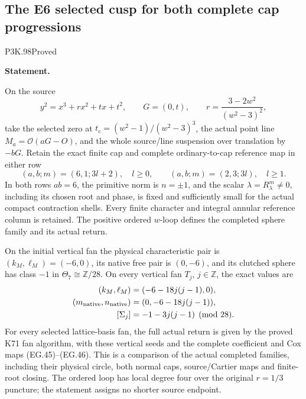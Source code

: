 \subsection{The E6 selected cusp for both complete cap progressions}
\begin{statement}{P3K.98}{Proved}
\par\medskip\noindent\textbf{Statement.}\par\nopagebreak[4]

On the source
\[
 y^2=x^3+r x^2+t x+t^2,\qquad G=(0,t),\qquad
 r=\frac{3-2w^2}{(w^2-3)^2},
\]
take the selected zero at
\(t_c=(w^2-1)/(w^2-3)^3\), the actual point line
\(M_a=\mathcal O(aG-O)\), and the whole source/line suspension
over translation by \(-bG\). Retain the exact finite cap and
complete ordinary-to-cap reference map in either row
\[
 (a,b;m)=(6,1;3l+2),\quad l\ge0,\qquad
 (a,b;m)=(2,3;3l),\quad l\ge1 .
 \tag{EG.1}
\]
In both rows \(ab=6\), the primitive norm is \(n=\pm1\), and the scalar
\(\lambda=R_\lambda^m\ne0\), including its chosen root and
phase, is fixed and sufficiently small for the actual compact
contraction shells. Every finite character and integral annular
reference column is retained. The positive ordered \(w\)-loop
defines the completed sphere family and its actual return.

On the initial vertical fan the physical characteristic pair is
\((k_M,\ell_M)=(-6,0)\), its native free pair is \((0,-6)\),
and its clutched sphere has class \(-1\) in \(\Theta_7\cong
\mathbb Z/28\). On every vertical fan \(T_j\), \(j\in\mathbb Z\),
the exact values are
\[
 \begin{split}
 (k_M,\ell_M)&=(-6-18j(j-1),0),\\
 (m_{\rm native},n_{\rm native})&=(0,-6-18j(j-1)),\\
 [\Sigma_j]&=-1-3j(j-1)\pmod {28}.
 \end{split}
\]
For every selected lattice-basis fan, the full actual return is
given by the proved K71 fan algorithm, with these vertical seeds
and the complete coefficient and Cox maps (EG.45)--(EG.46).
This is a comparison of the actual completed families, including
their physical circle, both normal caps, source/Cartier maps and
finite-root closing. The ordered loop has local degree four over
the original \(r=1/3\) puncture; the statement assigns no shorter
source endpoint.

\end{statement}
